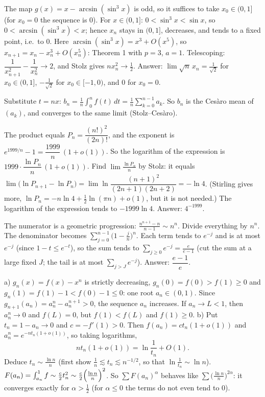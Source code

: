\documentclass[11pt,a4paper]{article}
\begin{document}

 The map $g(x)=x-\arcsin(\sin^3x)$ is odd, so it suffices to take $x_0\in(0,1]$ (for $x_0=0$ the sequence is $0$). For $x\in(0,1]$: $0<\sin^3x<\sin x$, so $0<\arcsin(\sin^3x)<x$; hence $x_n$ stays in $(0,1]$, decreases, and tends to a fixed point, i.e.\ to $0$.
 Here $\arcsin(\sin^3x)=x^3+O(x^5)$, so $x_{n+1}=x_n-x_n^3+O(x_n^5)$: Theorem 1 with $p=3$, $a=1$. Telescoping: $\dfrac1{x_{n+1}^2}-\dfrac1{x_n^2}\to2$, and Stolz gives $nx_n^2\to\frac12$.
 Answer: $\lim\sqrt n\,x_n=\frac1{\sqrt2}$ for $x_0\in(0,1]$, $-\frac1{\sqrt2}$ for $x_0\in[-1,0)$, and $0$ for $x_0=0$.

 Substitute $t=nx$: $b_n=\frac1n\int_0^nf(t)\,dt=\frac1n\sum_{k=0}^{n-1}a_k$.
 So $b_n$ is the Ces\`aro mean of $(a_k)$, and converges to the same limit (Stolz--Ces\`aro).

 The product equals $P_n=\dfrac{(n!)^2}{(2n)!}$, and the exponent is $e^{1999/n}-1=\dfrac{1999}n\,(1+o(1))$. So the logarithm of the expression is $1999\cdot\dfrac{\ln P_n}n\,(1+o(1))$.
 Find $\lim\frac{\ln P_n}n$ by Stolz: it equals $\lim\bigl(\ln P_{n+1}-\ln P_n\bigr)=\lim\ln\dfrac{(n+1)^2}{(2n+1)(2n+2)}=-\ln4$. (Stirling gives more, $\ln P_n=-n\ln4+\frac12\ln(\pi n)+o(1)$, but it is not needed.)
 The logarithm of the expression tends to $-1999\ln4$. Answer: $4^{-1999}$.

 The numerator is a geometric progression: $\frac{n^{n+1}-n}{n-1}\sim n^n$. Divide everything by $n^n$.
 The denominator becomes $\sum_{j=0}^{n-1}\bigl(1-\frac jn\bigr)^n$. Each term tends to $e^{-j}$ and is at most $e^{-j}$ (since $1-t\le e^{-t}$), so the sum tends to $\sum_{j\ge0}e^{-j}=\frac e{e-1}$ (cut the sum at a large fixed $J$; the tail is at most $\sum_{j>J}e^{-j}$).
 Answer: $\dfrac{e-1}e$.

 a) $g_n(x)=f(x)-x^n$ is strictly decreasing, $g_n(0)=f(0)>f(1)\ge0$ and $g_n(1)=f(1)-1<f(0)-1\le0$: one root $a_n\in(0,1)$. Since $g_{n+1}(a_n)=a_n^n-a_n^{n+1}>0$, the sequence $a_n$ increases. If $a_n\to L<1$, then $a_n^n\to0$ and $f(L)=0$, but $f(1)<f(L)$ and $f(1)\ge0$.
 b) Put $t_n=1-a_n\to0$ and $c=-f'(1)>0$. Then $f(a_n)=ct_n(1+o(1))$ and $a_n^n=e^{-nt_n(1+o(1))}$, so taking logarithms,
\[nt_n(1+o(1))=\ln\frac1{t_n}+O(1).\]
Deduce $t_n\sim\frac{\ln n}n$ (first show $\frac1n\lesssim t_n\lesssim n^{-1/2}$, so that $\ln\frac1{t_n}\sim\ln n$).
 $F(a_n)=\int_{a_n}^1f\sim\frac c2t_n^2\sim\frac c2\Bigl(\frac{\ln n}n\Bigr)^2$. So $\sum F(a_n)^\alpha$ behaves like $\sum\bigl(\frac{\ln n}n\bigr)^{2\alpha}$: it converges exactly for $\alpha>\frac12$ (for $\alpha\le0$ the terms do not even tend to $0$).
\end{document}
